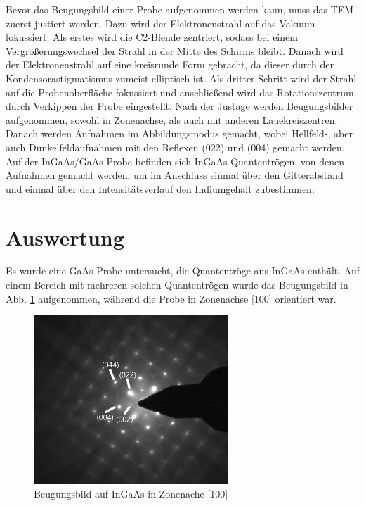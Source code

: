 \documentclass[a4paper,11pt,DIV=11]{scrartcl}
\begin{document}
Bevor das Beugungsbild einer Probe aufgenommen werden kann, muss das TEM zuerst justiert werden. Dazu wird der Elektronenstrahl auf das Vakuum fokussiert. Als erstes wird die C2-Blende zentriert, sodass bei einem Vergrößerungswechsel der Strahl in der Mitte des Schirms bleibt. Danach wird der Elektronenstrahl auf eine kreisrunde Form gebracht, da dieser durch den Kondensorastigmatismus zumeist elliptisch ist. Als dritter Schritt wird der Strahl auf die Probenoberfläche fokussiert und anschließend wird das Rotationszentrum durch Verkippen der Probe eingestellt. Nach der Justage werden Beugungsbilder aufgenommen, sowohl in Zonenachse, als auch mit anderen Lauekreiszentren. Danach werden Aufnahmen im Abbildungsmodus gemacht, wobei Hellfeld-, aber auch Dunkelfeldaufnahmen mit den Reflexen (022) und (004) gemacht werden. Auf der InGaAs/GaAs-Probe befinden sich InGaAs-Quantentrögen, von denen Aufnahmen gemacht werden, um im Anschluss einmal über den Gitterabstand und einmal über den Intensitätsverlauf den Indiumgehalt zubestimmen.

\section{Auswertung}

Es wurde eine GaAs Probe untersucht, die Quantentröge aus InGaAs enthält. Auf einem Bereich mit mehreren solchen Quantentrögen wurde das Beugungsbild in Abb. \ref{100ind} aufgenommen, während die Probe in Zonenachse [100] orientiert war.

\begin{figure}[h]\centering
	\includegraphics[width=0.65\textwidth]{Versuchsdaten/8/indiziert2.png}
\caption{Beugungsbild auf InGaAs in Zonenache [100]}
\label{100ind}
\end{figure}
\end{document}
